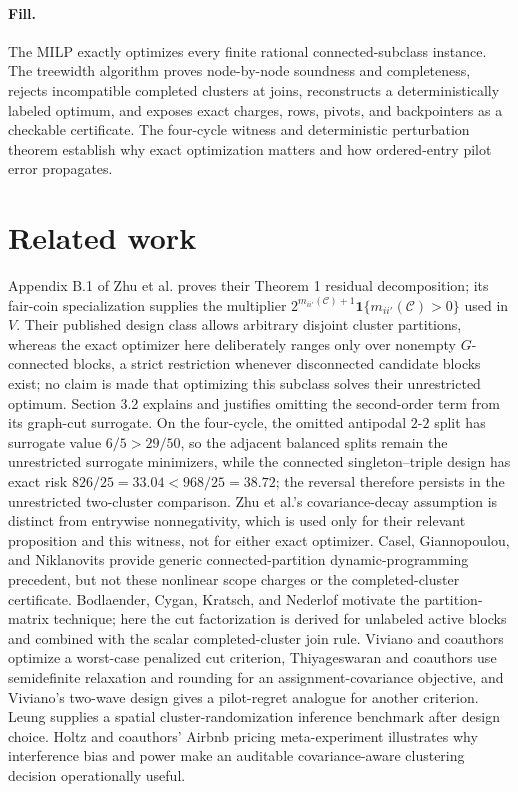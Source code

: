 \documentclass{article}
\begin{document}
\paragraph{Fill.} The MILP exactly optimizes every finite rational connected-subclass instance.  The treewidth algorithm proves node-by-node soundness and completeness, rejects incompatible completed clusters at joins, reconstructs a deterministically labeled optimum, and exposes exact charges, rows, pivots, and backpointers as a checkable certificate.  The four-cycle witness and deterministic perturbation theorem establish why exact optimization matters and how ordered-entry pilot error propagates.

\section{Related work}

Appendix B.1 of Zhu et al. proves their Theorem 1 residual decomposition; its fair-coin specialization supplies the multiplier \(2^{m_{ii'}(\mathcal C)+1}\mathbf 1\{m_{ii'}(\mathcal C)>0\}\) used in \(V\).  Their published design class allows arbitrary disjoint cluster partitions, whereas the exact optimizer here deliberately ranges only over nonempty \(G\)-connected blocks, a strict restriction whenever disconnected candidate blocks exist; no claim is made that optimizing this subclass solves their unrestricted optimum.  Section 3.2 explains and justifies omitting the second-order term from its graph-cut surrogate.  On the four-cycle, the omitted antipodal \(2\)-\(2\) split has surrogate value \(6/5>29/50\), so the adjacent balanced splits remain the unrestricted surrogate minimizers, while the connected singleton--triple design has exact risk \(826/25=33.04<968/25=38.72\); the reversal therefore persists in the unrestricted two-cluster comparison.  Zhu et al.'s covariance-decay assumption is distinct from entrywise nonnegativity, which is used only for their relevant proposition and this witness, not for either exact optimizer.  Casel, Giannopoulou, and Niklanovits provide generic connected-partition dynamic-programming precedent, but not these nonlinear scope charges or the completed-cluster certificate.  Bodlaender, Cygan, Kratsch, and Nederlof motivate the partition-matrix technique; here the cut factorization is derived for unlabeled active blocks and combined with the scalar completed-cluster join rule.  Viviano and coauthors optimize a worst-case penalized cut criterion, Thiyageswaran and coauthors use semidefinite relaxation and rounding for an assignment-covariance objective, and Viviano's two-wave design gives a pilot-regret analogue for another criterion.  Leung supplies a spatial cluster-randomization inference benchmark after design choice.  Holtz and coauthors' Airbnb pricing meta-experiment illustrates why interference bias and power make an auditable covariance-aware clustering decision operationally useful.
\end{document}
